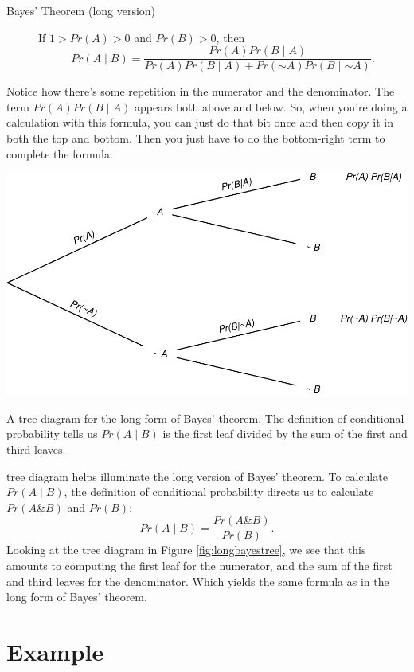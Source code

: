 \documentclass[justified]{tufte-book}
\newcommand{\given}{\mid}
\renewcommand{\neg}{\mathbin{\sim}}
\renewcommand{\wedge}{\mathbin{\&}}
\newcommand{\p}{Pr}
\theoremstyle{definition}
\theoremstyle{definition}
\theoremstyle{definition}
\theoremstyle{remark}
\begin{document}
\begin{description}
\item[Bayes' Theorem (long version)]
If \(1 > \p(A) > 0\) and \(\p(B)>0\), then
\[ \p(A \given B) = \frac{\p(A)\p(B \given A)}{\p(A)\p(B \given A) + \p(\neg A)\p(B \given \neg A)}. \]
\end{description}

Notice how there's some repetition in the numerator and the denominator.
The term \(\p(A)\p(B \given A)\) appears both above and below. So, when
you're doing a calculation with this formula, you can just do that bit
once and then copy it in both the top and bottom. Then you just have to
do the bottom-right term to complete the formula.

\begin{marginfigure}
\includegraphics{_main_files/figure-latex/longbayestree-1} \caption[A tree diagram for the long form of Bayes' theorem]{A tree diagram for the long form of Bayes' theorem. The definition of conditional probability tells us $\p(A \given B)$ is the first leaf divided by the sum of the first and third leaves.}\label{fig:longbayestree}
\end{marginfigure}

 tree diagram helps illuminate the long version of Bayes'
theorem. To calculate \(\p(A \given B)\), the definition of conditional
probability directs us to calculate \(\p(A \wedge B)\) and \(\p(B)\):
\[ \p(A \given B) = \frac{ \p(A \wedge B) }{ \p(B) }. \] Looking at the
tree diagram in Figure \ref{fig:longbayestree}, we see that this amounts
to computing the first leaf for the numerator, and the sum of the first
and third leaves for the denominator. Which yields the same formula as
in the long form of Bayes' theorem.

\hypertarget{example-1}{%
\section{Example}\label{example-1}}
\end{document}
